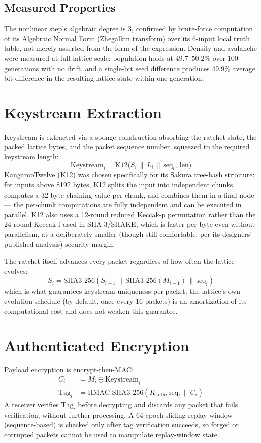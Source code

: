\documentclass[twocolumn,10pt,journal,compsoc]{IEEEtran}
\begin{document}
\subsection{Measured Properties}
The nonlinear step's algebraic degree is 3, confirmed by brute-force computation of its Algebraic Normal Form (Zhegalkin transform) over its 6-input local truth table, not merely asserted from the form of the expression. Density and avalanche were measured at full lattice scale: population holds at $49.7$--$50.2\%$ over 100 generations with no drift, and a single-bit seed difference produces $49.9\%$ average bit-difference in the resulting lattice state within one generation.

\section{Keystream Extraction}
\label{sec:extraction}
Keystream is extracted via a sponge construction absorbing the ratchet state, the packed lattice bytes, and the packet sequence number, squeezed to the required keystream length:
\begin{equation}
\text{Keystream}_i = \text{K12}\big(S_i \,\|\, L_i \,\|\, \text{seq}_i,\ \text{len}\big)
\end{equation}
KangarooTwelve (K12) was chosen specifically for its Sakura tree-hash structure: for inputs above 8192 bytes, K12 splits the input into independent chunks, computes a 32-byte chaining value per chunk, and combines them in a final node --- the per-chunk computations are fully independent and can be executed in parallel. K12 also uses a 12-round reduced Keccak-p permutation rather than the 24-round Keccak-f used in SHA-3/SHAKE, which is faster per byte even without parallelism, at a deliberately smaller (though still comfortable, per its designers' published analysis) security margin.

The ratchet itself advances every packet regardless of how often the lattice evolves:
\begin{equation}
S_i = \text{SHA3-256}(S_{i-1} \,\|\, \text{SHA3-256}(M_{i-1}) \,\|\, \text{seq}_i)
\end{equation}
which is what guarantees keystream uniqueness per packet; the lattice's own evolution schedule (by default, once every 16 packets) is an amortization of its computational cost and does not weaken this guarantee.

\section{Authenticated Encryption}
Payload encryption is encrypt-then-MAC:
\begin{align}
C_i &= M_i \oplus \text{Keystream}_i \\
\text{Tag}_i &= \text{HMAC-SHA3-256}(K_{\text{auth}}, \text{seq}_i \,\|\, C_i)
\end{align}
A receiver verifies $\text{Tag}_i$ before decrypting and discards any packet that fails verification, without further processing. A 64-epoch sliding replay window (sequence-based) is checked only after tag verification succeeds, so forged or corrupted packets cannot be used to manipulate replay-window state.
\end{document}
